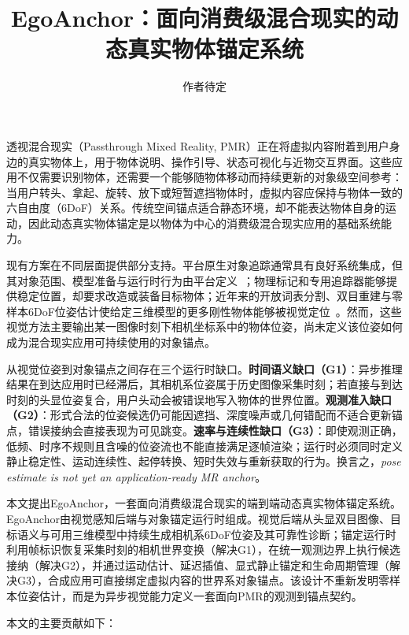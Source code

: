 \documentclass[review]{vgtc}
\title{EgoAnchor：面向消费级混合现实的动态真实物体锚定系统}
\author{作者待定}
\begin{document}
\label{sec:introduction}
\maketitle

透视混合现实（Passthrough Mixed Reality, PMR）正在将虚拟内容附着到用户身边的真实物体上，用于物体说明、操作引导、状态可视化与近物交互界面。这些应用不仅需要识别物体，还需要一个能够随物体移动而持续更新的对象级空间参考：当用户转头、拿起、旋转、放下或短暂遮挡物体时，虚拟内容应保持与物体一致的六自由度（6DoF）关系。传统空间锚点适合静态环境，却不能表达物体自身的运动，因此动态真实物体锚定是以物体为中心的消费级混合现实应用的基础系统能力。

现有方案在不同层面提供部分支持。平台原生对象追踪通常具有良好系统集成，但其对象范围、模型准备与运行时行为由平台定义~\cite{appleObjectAnchor,azureObjectAnchors,metaDynamicObjectTracker}；物理标记和专用追踪器能够提供稳定位置，却要求改造或装备目标物体；近年来的开放词表分割、双目重建与零样本6DoF位姿估计使给定三维模型的更多刚性物体能够被视觉定位~\cite{foundationpose2023,megapose2022}。然而，这些视觉方法主要输出某一图像时刻下相机坐标系中的物体位姿，尚未定义该位姿如何成为混合现实应用可持续使用的对象锚点。

从视觉位姿到对象锚点之间存在三个运行时缺口。\textbf{时间语义缺口（G1）}：异步推理结果在到达应用时已经滞后，其相机系位姿属于历史图像采集时刻；若直接与到达时刻的头显位姿复合，用户头动会被错误地写入物体的世界位置。\textbf{观测准入缺口（G2）}：形式合法的位姿候选仍可能因遮挡、深度噪声或几何错配而不适合更新锚点，错误接纳会直接表现为可见跳变。\textbf{速率与连续性缺口（G3）}：即使观测正确，低频、时序不规则且含噪的位姿流也不能直接满足逐帧渲染；运行时必须同时定义静止稳定性、运动连续性、起停转换、短时失效与重新获取的行为。换言之，\emph{pose estimate is not yet an application-ready MR anchor}。

本文提出EgoAnchor，一套面向消费级混合现实的端到端动态真实物体锚定系统。EgoAnchor由视觉感知后端与对象锚定运行时组成。视觉后端从头显双目图像、目标语义与可用三维模型中持续生成相机系6DoF位姿及其可靠性诊断；锚定运行时利用帧标识恢复采集时刻的相机世界变换（解决G1），在统一观测边界上执行候选接纳（解决G2），并通过运动估计、延迟插值、显式静止锚定和生命周期管理（解决G3），合成应用可直接绑定虚拟内容的世界系对象锚点。该设计不重新发明零样本位姿估计，而是为异步视觉能力定义一套面向PMR的观测到锚点契约。

本文的主要贡献如下：
\end{document}
